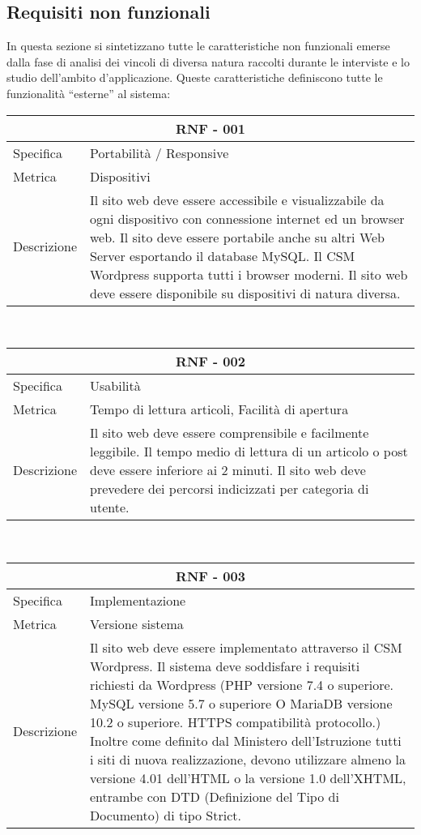 \documentclass{article}
\begin{document}
\subsection{\textbf{Requisiti non funzionali}}
In questa sezione si sintetizzano tutte le caratteristiche non funzionali emerse dalla fase di  analisi dei vincoli di diversa natura raccolti durante le interviste e lo studio dell'ambito d'applicazione. Queste caratteristiche definiscono tutte le funzionalità “esterne” al sistema:
\vspace{4mm} \vspace{4mm} 
\begin{tabular}{ |p{3cm}|p{8cm}|  }
	\hline
	\multicolumn{2}{|c|}{\textbf{RNF - 001}} \\
	\hline
	Specifica&Portabilità / Responsive\\
	\hline
	Metrica & Dispositivi\\
	\hline
	Descrizione&Il sito web deve essere accessibile e visualizzabile da ogni dispositivo con connessione internet ed un browser web. Il sito deve essere portabile anche su altri Web Server esportando il database MySQL. Il CSM Wordpress supporta tutti i browser moderni. Il sito web deve essere disponibile su dispositivi di natura diversa.\\
	\hline
\end{tabular}\\
\vspace{4mm} 
\begin{tabular}{ |p{3cm}|p{8cm}|  }
	\hline
	\multicolumn{2}{|c|}{\textbf{RNF - 002}} \\
	\hline
	Specifica&Usabilità \\
	\hline
	Metrica & Tempo di lettura articoli, Facilità di apertura\\
	\hline
	Descrizione&Il sito web deve essere comprensibile e facilmente leggibile. Il tempo medio di lettura di un articolo o post deve essere inferiore ai 2 minuti. Il sito web deve prevedere dei percorsi indicizzati per categoria di utente.\\
	\hline
\end{tabular}\\
\vspace{4mm} 
\begin{tabular}{ |p{3cm}|p{8cm}|  }
	\hline
	\multicolumn{2}{|c|}{\textbf{RNF - 003}} \\
	\hline
	Specifica &Implementazione\\
	\hline
	Metrica &  Versione sistema\\
	\hline
	Descrizione&Il sito web deve essere implementato attraverso il CSM Wordpress. Il sistema deve soddisfare i requisiti richiesti da Wordpress (PHP versione 7.4 o superiore.
	MySQL versione 5.7 o superiore O MariaDB versione 10.2 o superiore.
	HTTPS compatibilità protocollo.) Inoltre come definito dal Ministero dell'Istruzione tutti i siti di nuova realizzazione, devono utilizzare almeno la versione 4.01 dell'HTML o la versione 1.0 dell'XHTML, entrambe con DTD (Definizione del Tipo di Documento) di tipo Strict.\\
	\hline
\end{tabular}\\
\end{document}
